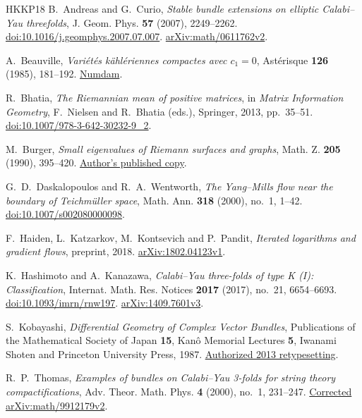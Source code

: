 \begin{thebibliography}{HKKP18}
B.~Andreas and G.~Curio,
\emph{Stable bundle extensions on elliptic Calabi--Yau threefolds},
J. Geom. Phys. \textbf{57} (2007), 2249--2262.
\href{https://doi.org/10.1016/j.geomphys.2007.07.007}{doi:10.1016/j.geomphys.2007.07.007}.
\href{https://arxiv.org/abs/math/0611762v2}{arXiv:math/0611762v2}.

A.~Beauville, \emph{Vari\'et\'es k\"ahl\'eriennes compactes avec $c_1=0$},
Ast\'erisque \textbf{126} (1985), 181--192.
\href{https://www.numdam.org/item/AST_1985__126__181_0/}{Numdam}.

R.~Bhatia, \emph{The Riemannian mean of positive matrices}, in
\emph{Matrix Information Geometry}, F.~Nielsen and R.~Bhatia (eds.),
Springer, 2013, pp.~35--51.
\href{https://doi.org/10.1007/978-3-642-30232-9_2}{doi:10.1007/978-3-642-30232-9\_2}.

M.~Burger, \emph{Small eigenvalues of Riemann surfaces and graphs},
Math. Z. \textbf{205} (1990), 395--420.
\href{https://people.math.ethz.ch/~burger/pub/1990_Small_eigenvalues.pdf}{Author's published copy}.

G.~D.~Daskalopoulos and R.~A.~Wentworth,
\emph{The Yang--Mills flow near the boundary of Teichm\"uller space},
Math. Ann. \textbf{318} (2000), no.~1, 1--42.
\href{https://doi.org/10.1007/s002080000098}{doi:10.1007/s002080000098}.

F.~Haiden, L.~Katzarkov, M.~Kontsevich and P.~Pandit,
\emph{Iterated logarithms and gradient flows}, preprint, 2018.
\href{https://arxiv.org/abs/1802.04123v1}{arXiv:1802.04123v1}.

K.~Hashimoto and A.~Kanazawa,
\emph{Calabi--Yau three-folds of type K (I): Classification},
Internat. Math. Res. Notices \textbf{2017} (2017), no.~21, 6654--6693.
\href{https://doi.org/10.1093/imrn/rnw197}{doi:10.1093/imrn/rnw197}.
\href{https://arxiv.org/abs/1409.7601v3}{arXiv:1409.7601v3}.

S.~Kobayashi, \emph{Differential Geometry of Complex Vector Bundles},
Publications of the Mathematical Society of Japan \textbf{15},
Kan\^o Memorial Lectures \textbf{5}, Iwanami Shoten and
Princeton University Press, 1987.
\href{https://www.mathsoc.jp/assets/pdf/publications/pubmsj/Vol15.pdf}{Authorized 2013 retypesetting}.

R.~P.~Thomas,
\emph{Examples of bundles on Calabi--Yau 3-folds for string theory compactifications},
Adv. Theor. Math. Phys. \textbf{4} (2000), no.~1, 231--247.
\href{https://arxiv.org/abs/math/9912179v2}{Corrected arXiv:math/9912179v2}.


\end{thebibliography}

